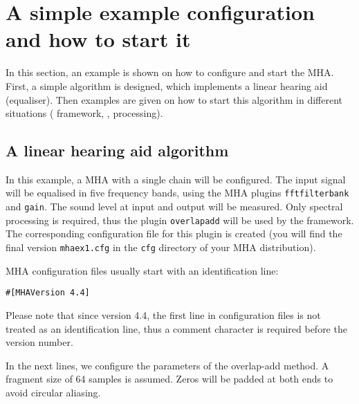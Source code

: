 \section{A simple example configuration and how to start it}%
\label{sec:scenarios}%
%
%
%

In this section, an example is shown on how to configure and start the
MHA. First, a simple algorithm is designed, which implements a 
linear hearing aid (equaliser). Then examples are given on
how to start this algorithm in different situations (\Windows{}
framework, \mhad{}, \Matlab{} processing).

\subsection{A linear hearing aid algorithm}%
\label{sec:linha}%

In this example, a MHA with a single chain will be configured. The
input signal will be equalised in five frequency bands, using the MHA
plugins \verb!fftfilterbank! and
\verb!gain!. The sound level at input and
output will be measured. Only spectral processing is required, thus
the plugin \verb!overlapadd! will be
used by the framework. The corresponding configuration file for this
plugin is created (you will find the final version \verb!mhaex1.cfg!
in the \verb!cfg!  directory of your MHA distribution).

MHA configuration files usually start with an identification line:
\begin{verbatim}
#[MHAVersion 4.4]
\end{verbatim}
Please note that since version 4.4, the first line in configuration
files is not treated as an identification line, thus a comment
character is required before the version number.

In the next lines, we configure the parameters of the overlap-add
method. A fragment size of 64 samples is assumed. Zeros will be padded
at both ends to avoid circular aliasing.

